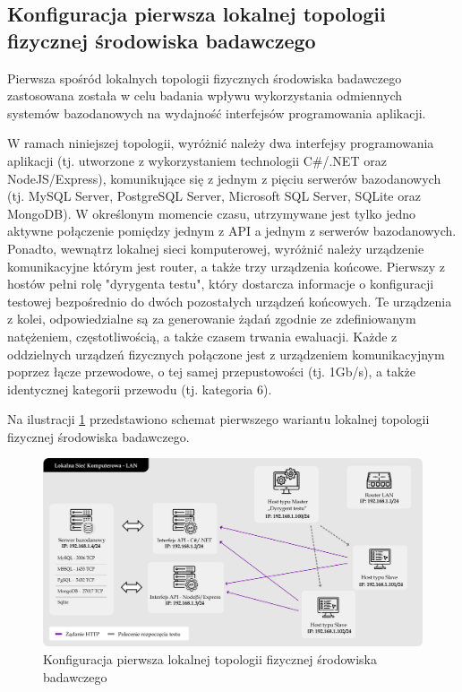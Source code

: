 \subsection*{Konfiguracja pierwsza lokalnej topologii fizycznej środowiska badawczego}
\label{sec:lokalne-srodowisko-badawcze-ver-1}
Pierwsza spośród lokalnych topologii fizycznych środowiska badawczego zastosowana została w celu badania wpływu wykorzystania odmiennych systemów bazodanowych na wydajność interfejsów programowania aplikacji.

W ramach niniejszej topologii, wyróżnić należy dwa interfejsy programowania aplikacji (tj. utworzone z wykorzystaniem technologii C\#/.NET oraz NodeJS/Express), komunikujące się z jednym z pięciu serwerów bazodanowych (tj. MySQL Server, PostgreSQL Server, Microsoft SQL Server, SQLite oraz MongoDB). W określonym momencie czasu, utrzymywane jest tylko jedno aktywne połączenie pomiędzy jednym z API a jednym z serwerów bazodanowych. Ponadto, wewnątrz lokalnej sieci komputerowej, wyróżnić należy urządzenie komunikacyjne którym jest router, a także trzy urządzenia końcowe. Pierwszy z hostów pełni rolę "dyrygenta testu", który dostarcza informacje o konfiguracji testowej bezpośrednio do dwóch pozostałych urządzeń końcowych. Te urządzenia z kolei, odpowiedzialne są za generowanie żądań zgodnie ze zdefiniowanym natężeniem, częstotliwością, a także czasem trwania ewaluacji. Każde z oddzielnych urządzeń fizycznych połączone jest z urządzeniem komunikacyjnym poprzez łącze przewodowe, o tej samej przepustowości (tj. 1Gb/s), a także identycznej kategorii przewodu (tj. kategoria 6).

Na ilustracji \ref{fig:topologia-1} przedstawiono schemat pierwszego wariantu lokalnej topologii fizycznej środowiska badawczego.

\begin{figure}[ht]
    \centering
     \includegraphics[width=\linewidth]{rys04/topologia-1.png}
    \caption{Konfiguracja pierwsza lokalnej topologii fizycznej środowiska badawczego}
    \label{fig:topologia-1}
\end{figure}

